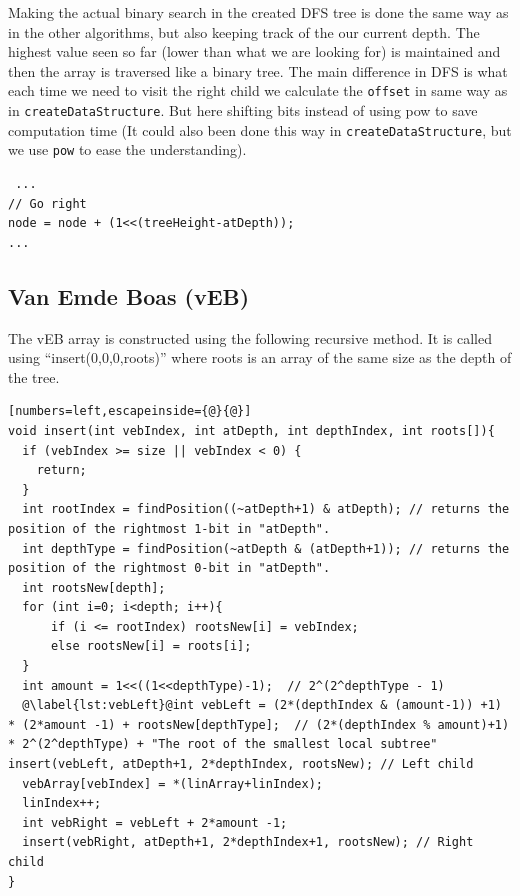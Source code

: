 Making the actual binary search in the created DFS tree is done the same way as in the other algorithms, but also keeping track of the our current depth.
The highest value seen so far (lower than what we are looking for) is maintained and then the array is traversed like a binary tree. 
The main difference in DFS is what each time we need to visit the right child we calculate the \verb!offset! in same way as in \verb!createDataStructure!.  
But here shifting bits instead of using pow to save computation time (It could also been done this way in \verb!createDataStructure!, but we use \verb!pow! to ease the understanding). 
\begin{lstlisting}
 ...
// Go right
node = node + (1<<(treeHeight-atDepth));
...
\end{lstlisting}



\subsection{Van Emde Boas (vEB)}

The vEB array is constructed using the following recursive method. It is called using ``insert(0,0,0,roots)'' where roots is an array of the same size as the depth of the tree.

\begin{lstlisting}[numbers=left,escapeinside={@}{@}]
void insert(int vebIndex, int atDepth, int depthIndex, int roots[]){
  if (vebIndex >= size || vebIndex < 0) {
    return;
  }
  int rootIndex = findPosition((~atDepth+1) & atDepth); // returns the position of the rightmost 1-bit in "atDepth".
  int depthType = findPosition(~atDepth & (atDepth+1)); // returns the position of the rightmost 0-bit in "atDepth".
  int rootsNew[depth];
  for (int i=0; i<depth; i++){
      if (i <= rootIndex) rootsNew[i] = vebIndex;
      else rootsNew[i] = roots[i];
  }
  int amount = 1<<((1<<depthType)-1);  // 2^(2^depthType - 1)
  @\label{lst:vebLeft}@int vebLeft = (2*(depthIndex & (amount-1)) +1) * (2*amount -1) + rootsNew[depthType];  // (2*(depthIndex % amount)+1) * 2^(2^depthType) + "The root of the smallest local subtree"  insert(vebLeft, atDepth+1, 2*depthIndex, rootsNew); // Left child
  vebArray[vebIndex] = *(linArray+linIndex);
  linIndex++;
  int vebRight = vebLeft + 2*amount -1;
  insert(vebRight, atDepth+1, 2*depthIndex+1, rootsNew); // Right child
}
\end{lstlisting}

